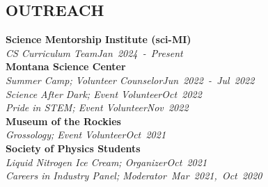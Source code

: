 \documentclass[margin]{res}
\begin{document}
\begin{resume}
\section{\uppercase{Outreach}}
\textbf{Science Mentorship Institute (sci-MI)}\\
\hspace{3ex} {\sl CS Curriculum Team}\hfill {\sl Jan~2024~-~Present}\\
\textbf{Montana Science Center}\\
\hspace{3ex} {\sl Summer Camp; Volunteer Counselor}\hfill {\sl Jun~2022~-~Jul~2022}\\
\hspace{3ex} {\sl Science After Dark; Event Volunteer}\hfill {\sl Oct~2022}\\
\hspace{3ex} {\sl Pride in STEM; Event Volunteer}\hfill {\sl Nov~2022}\vspace*{1ex}\\
\textbf{Museum of the Rockies}\\
\hspace{3ex} {\sl Grossology; Event Volunteer}\hfill {\sl Oct~2021}\vspace*{1ex}\\
\textbf{Society of Physics Students}\vspace*{0.5ex}\\
\hspace{3ex} {\sl Liquid Nitrogen Ice Cream; Organizer}\hfill {\sl Oct~2021}\vspace*{0.5ex}\\
\hspace{3ex} {\sl Careers in Industry Panel; Moderator}\hfill {\sl ~Mar~2021,~Oct~2020}


%
\end{resume}

\end{document}
